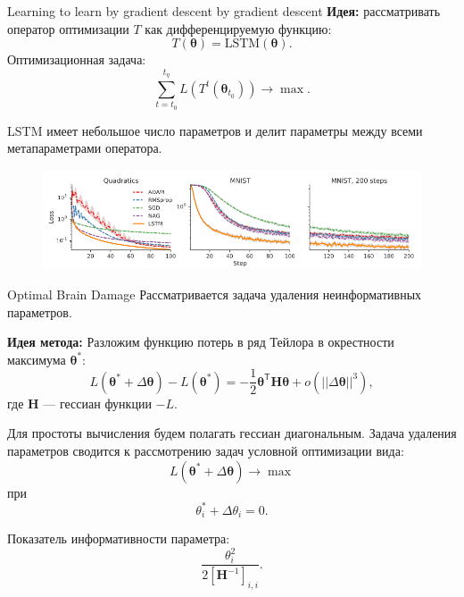 \documentclass[10pt,pdf,utf8,russian,aspectratio=169]{beamer}
\begin{document}
\begin{frame}{Learning to learn by gradient descent by gradient descent}
\textbf{Идея: } рассматривать оператор оптимизации $T$ как дифференцируемую функцию:
\[
    T(\boldsymbol{\theta}) = \text{LSTM}(\boldsymbol{\theta}).
\]
Оптимизационная задача:
\[
    \sum_{t=t_0}^{t_\eta} L\left(T^t(\boldsymbol{\theta}_{t_0})\right) \to \max.
\]

LSTM имеет небольшое число параметров и делит параметры между всеми метапараметрами оператора.

\begin{figure}
\includegraphics[width=\textwidth]{sgd_by_sgd.png}
\end{figure}
\end{frame}


\begin{frame}{Optimal Brain Damage}
Рассматривается задача удаления неинформативных параметров.

\textbf{Идея метода:}
Разложим функцию потерь в ряд Тейлора в окрестности максимума $\boldsymbol{\theta}^{*}:$
\[
    L(\boldsymbol{\theta}^{*} + \Delta \boldsymbol{\theta}) -  L(\boldsymbol{\theta}^{*} ) = -\frac{1}{2} \boldsymbol{\theta}^\mathsf{T} \mathbf{H} \boldsymbol{\theta}  + o(||\Delta \boldsymbol{\theta}||^3),
\]
где $\mathbf{H}$ --- гессиан функции $-L$.

Для простоты вычисления будем полагать гессиан диагональным. Задача удаления параметров сводится к рассмотрению задач условной оптимизации вида:
\[
    L(\boldsymbol{\theta}^{*} + \Delta \boldsymbol{\theta}) \to \max 
\]
при 
\[
    {\theta}^{*}_i + \Delta \theta_i = 0.
\]

Показатель информативности параметра: 
\[
    \frac{\theta_{i}^2}{2[\mathbf{H}^{-1}]_{i,i}}.
\]

\end{frame}
\end{document}
